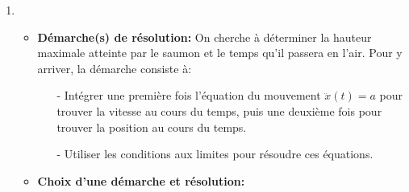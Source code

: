 \begin{enumerate}
Graphiquement, la position et la vitesse au cours du temps sont donn\'ees dans les deux figures ci-dessus. On peut remarquer que: 
\begin{itemize}
\item La position au cours du temps est donn\'ee par un polyn\^ome du deuxi\`eme degr\'e. Graphiquement, on a donc une parabole. 
\item Le sommet de la parabole correspond \`a l'altitude maximale atteinte par le saumon, \`a un instant que l'on nomme $t=t_{\rm max}$.
\item La vitesse diminue lin\'eairement. Graphiquement, elle est repr\'esent\'ee par une droite. La pente de cette droite est \'egale \`a l'acc\'el\'eration du saumon. 
\item A l'instant $t_{\rm max}$, la droite croise l'abscisse: la vitesse du saumon est nulle au sommet de la trajectoire. En tout point, la vitesse correspond \`a la d\'eriv\'ee de la position par rapport au temps. A l'instant $t_{\rm max}$, une vitesse nulle correspond donc au sommet de la parabole, de pente nulle. 
\item La parabole est sym\'etrique. Soit $t_{\rm saut}$ l'instant où le saumon retombe dans l'eau. On a $x(t_{\rm saut}) = 0$ et $t_{\rm max}= \frac{1}{2}t_{\rm saut}$.  
\end{itemize}
\item
\begin{itemize}
\item \textbf{D\'emarche(s) de r\'esolution:} On cherche \`a d\'eterminer la hauteur maximale atteinte par le saumon et le temps qu'il passera en l'air. Pour y arriver, la d\'emarche consiste \`a:
\begin{itemize}
\item[-] Int\'egrer une premi\`ere fois l'\'equation du mouvement $\ddot{x}(t)=a$ pour trouver la vitesse au cours du temps, puis une deuxi\`eme fois pour trouver la position au cours du temps.
\item[-] Utiliser les conditions aux limites pour r\'esoudre ces \'equations. \\
\end{itemize}
 \item \textbf{Choix d'une d\'emarche et r\'esolution:} 

\end{itemize}
\end{enumerate}
